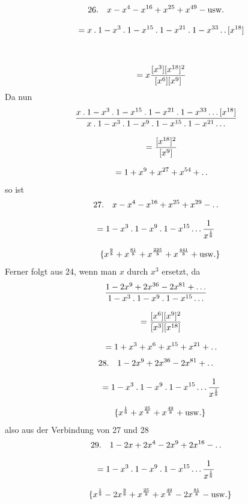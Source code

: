 \[
\begin{gathered}
26.\quad x-x^{4}-x^{16}+x^{25}+x^{49}-\mathrm{usw.}
 \\[8pt]\quad{}=x\mathbin{.}1-x^{3}\mathbin{.}1-x^{15}\mathbin{.}1-x^{21}\mathbin{.}1-x^{33}\mathinner{.\,.}[x^{18}]\\[8pt]
 \\[8pt]\quad{}=x\frac{[x^{3}][x^{18}]^{2}}{[x^{6}][x^{9}]}
\end{gathered}
\]
Da nun
\[
\begin{gathered}\frac{x\mathbin{.}1-x^{3}\mathbin{.}1-x^{15}\mathbin{.}1-x^{21}\mathbin{.}1-x^{33}\mathinner{.\,.\,.}[x^{18}]}
     {x\mathbin{.}1-x^{3}\mathbin{.}1-x^{9}\mathbin{.}1-x^{15}\mathbin{.}1-x^{21}\mathinner{.\,.\,.}}
 \\[8pt]\quad{}=\frac{[x^{18}]^{2}}{[x^{9}]}
\\[8pt]\quad{} =1+x^{9}+x^{27}+x^{54}+\mathinner{.\,.}\end{gathered}
\]
so ist
\[
\begin{gathered}
27.\quad x-x^{4}-x^{16}+x^{25}+x^{29}-\mathinner{.\,.}\\[8pt]
 =1-x^{3}\mathbin{.}1-x^{9}\mathbin{.}1-x^{15}\mathinner{.\,.\,.}\frac{1}{x^{\frac18}}
 \\[8pt]\quad{}\{x^{\frac98}+x^{\frac{81}{8}}+x^{\frac{225}{8}}+x^{\frac{441}{8}}+\mathrm{usw.}\}
\end{gathered}
\]
Ferner folgt aus 24, wenn man $x$ durch $x^{3}$ ersetzt, da
\[
\begin{gathered}\frac{1-2x^{9}+2x^{36}-2x^{81}+\mathinner{.\,.\,.}}
     {1-x^{3}\mathbin{.}1-x^{9}\mathbin{.}1-x^{15}\mathinner{.\,.\,.}}
 \\[8pt]\quad{}=\frac{[x^{6}][x^{9}]^{2}}{[x^{3}][x^{18}]}
\\[8pt]\quad{} =1+x^{3}+x^{6}+x^{15}+x^{21}+\mathinner{.\,.}\end{gathered}
\]
\[
\begin{gathered}28.\quad 1-2x^{9}+2x^{36}-2x^{81}+\mathinner{.\,.}
\\[8pt]\quad{} =1-x^{3}\mathbin{.}1-x^{9}\mathbin{.}1-x^{15}\mathinner{.\,.\,.}\frac{1}{x^{\frac18}}
 \\[8pt]\quad{}\{x^{\frac18}+x^{\frac{25}{8}}+x^{\frac{49}{8}}+\mathrm{usw.}\}\end{gathered}
\]
also aus der Verbindung von 27 und 28
\[
\begin{gathered}
29.\quad 1-2x+2x^{4}-2x^{9}+2x^{16}-\mathinner{.\,.}\\[8pt]
 =1-x^{3}\mathbin{.}1-x^{9}\mathbin{.}1-x^{15}\mathinner{.\,.\,.}\frac{1}{x^{\frac18}}
 \\[8pt]\quad{}\{x^{\frac18}-2x^{\frac98}+x^{\frac{25}{8}}+x^{\frac{49}{8}}-2x^{\frac{81}{8}}-\mathrm{usw.}\}
\end{gathered}
\]
